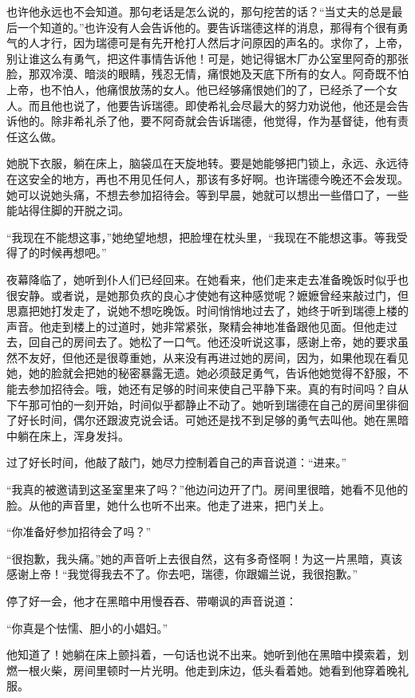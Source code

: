 \par 也许他永远也不会知道。那句老话是怎么说的，那句挖苦的话？“当丈夫的总是最后一个知道的。”也许没有人会告诉他的。要告诉瑞德这样的消息，那得有个很有勇气的人才行，因为瑞德可是有先开枪打人然后才问原因的声名的。求你了，上帝，别让谁这么有勇气，把这件事情告诉他！可是，她记得锯木厂办公室里阿奇的那张脸，那双冷漠、暗淡的眼睛，残忍无情，痛恨她及天底下所有的女人。阿奇既不怕上帝，也不怕人，他痛恨放荡的女人。他已经够痛恨她们的了，已经杀了一个女人。而且他也说了，他要告诉瑞德。即使希礼会尽最大的努力劝说他，他还是会告诉他的。除非希礼杀了他，要不阿奇就会告诉瑞德，他觉得，作为基督徒，他有责任这么做。
\par 她脱下衣服，躺在床上，脑袋瓜在天旋地转。要是她能够把门锁上，永远、永远待在这安全的地方，再也不用见任何人，那该有多好啊。也许瑞德今晚还不会发现。她可以说她头痛，不想去参加招待会。等到早晨，她就可以想出一些借口了，一些能站得住脚的开脱之词。
\par “我现在不能想这事，”她绝望地想，把脸埋在枕头里，“我现在不能想这事。等我受得了的时候再想吧。”
\par 夜幕降临了，她听到仆人们已经回来。在她看来，他们走来走去准备晚饭时似乎也很安静。或者说，是她那负疚的良心才使她有这种感觉呢？嬷嬷曾经来敲过门，但思嘉把她打发走了，说她不想吃晚饭。时间悄悄地过去了，她终于听到瑞德上楼的声音。他走到楼上的过道时，她非常紧张，聚精会神地准备跟他见面。但他走过去，回自己的房间去了。她松了一口气。他还没听说这事，感谢上帝，她的要求虽然不友好，但他还是很尊重她，从来没有再进过她的房间，因为，如果他现在看见她，她的脸就会把她的秘密暴露无遗。她必须鼓足勇气，告诉他她觉得不舒服，不能去参加招待会。哦，她还有足够的时间来使自己平静下来。真的有时间吗？自从下午那可怕的一刻开始，时间似乎都静止不动了。她听到瑞德在自己的房间里徘徊了好长时间，偶尔还跟波克说会话。可她还是找不到足够的勇气去叫他。她在黑暗中躺在床上，浑身发抖。
\par 过了好长时间，他敲了敲门，她尽力控制着自己的声音说道：“进来。”
\par “我真的被邀请到这圣室里来了吗？”他边问边开了门。房间里很暗，她看不见他的脸。从他的声音里，她什么也听不出来。他走了进来，把门关上。
\par “你准备好参加招待会了吗？”
\par “很抱歉，我头痛。”她的声音听上去很自然，这有多奇怪啊！为这一片黑暗，真该感谢上帝！“我觉得我去不了。你去吧，瑞德，你跟媚兰说，我很抱歉。”
\par 停了好一会，他才在黑暗中用慢吞吞、带嘲讽的声音说道：
\par “你真是个怯懦、胆小的小娼妇。”
\par 他知道了！她躺在床上颤抖着，一句话也说不出来。她听到他在黑暗中摸索着，划燃一根火柴，房间里顿时一片光明。他走到床边，低头看着她。她看到他穿着晚礼服。

